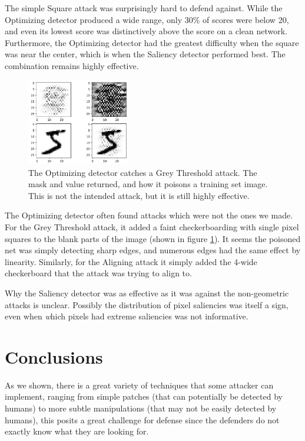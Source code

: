 \documentclass[letterpaper, 10 pt, conference]{ieeeconf}  %
\begin{document}
The simple Square attack was surprisingly hard to defend against.
While the Optimizing detector produced a wide range, only 30\% of
scores were below 20, and even its lowest score was distinctively
above the score on a clean network.  Furthermore, the Optimizing
detector had the greatest difficulty when the square was near the
center, which is when the Saliency detector performed best.  The
combination remains highly effective.

\begin{figure}
\centering
\includegraphics[width=0.4\textwidth]{catch_grey.png}
\caption{The Optimizing detector catches a Grey Threshold attack.  The mask and value returned, and how it poisons a training set image.  This is not the intended attack, but it is still highly effective.}
\label{catchgrey}
\end{figure}


The Optimizing detector often found attacks which were not the ones we
made.  For the Grey Threshold attack, it added a faint checkerboarding
with single pixel squares to the blank parts of the image (shown in
figure \ref{catchgrey}).  It seems
the poisoned net was simply detecting sharp edges, and numerous edges
had the same effect by linearity.  Similarly, for the Aligning attack
it simply added the 4-wide checkerboard that the attack was trying to
align to.

Why the Saliency detector was as effective as it was against the
non-geometric attacks is unclear.  Possibly the distribution of pixel
saliencies was itself a sign, even when {\textit which} pixels had
extreme saliencies was not informative.

\section{Conclusions}

As we shown, there is a great variety of techniques that some attacker can
implement, ranging from simple patches (that can potentially be detected by
humans) to more subtle manipulations (that may not be easily detected
by humans), this posits a great challenge for defense since the defenders do
not exactly know what they are looking for.
\end{document}
